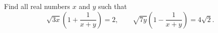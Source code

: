 Find all real numbers $x$ and $y$ such that
\[
\sqrt{3x}\left(1+\dfrac{1}{x+y}\right)=2,\qquad \sqrt{7y}\left(1-\dfrac{1}{x+y}\right)=4\sqrt{2}.
\]

